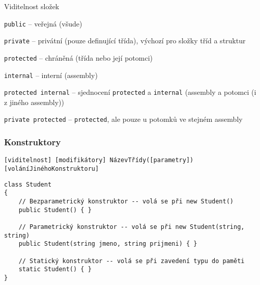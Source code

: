\begin{frame}[fragile]
\begin{bitemize}{Viditelnost složek}
\item \lstinline|public| -- veřejná (všude)
\item \lstinline|private| -- privátní (pouze definující třída), výchozí pro složky tříd a struktur
\item \lstinline|protected| -- chráněná (třída nebo její potomci)
\item \lstinline|internal| -- interní (assembly)
\item \lstinline|protected internal| -- sjednocení \lstinline|protected| a \lstinline|internal| (assembly a potomci (i z jiného assembly))
\item \lstinline|private protected| -- \lstinline|protected|, ale pouze u potomků ve stejném assembly
\end{bitemize}
\end{frame}









\begin{frame}[fragile]
\frametitle{Konstruktory}
\begin{noteblock}{}
\begin{lstlisting}
[viditelnost] [modifikátory] NázevTřídy([parametry]) [voláníJinéhoKonstruktoru]
\end{lstlisting}
\end{noteblock}

\begin{yesblock}
\begin{lstlisting}[basicstyle=\small]
class Student
{
    // Bezparametrický konstruktor -- volá se při new Student()
    public Student() { }

    // Parametrický konstruktor -- volá se při new Student(string, string)
    public Student(string jmeno, string prijmeni) { }

    // Statický konstruktor -- volá se při zavedení typu do paměti
    static Student() { }
}
\end{lstlisting}
\end{yesblock}
\end{frame}


